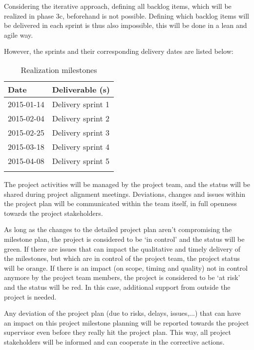 Considering the iterative approach, defining all backlog items, which will be realized in phase 3c, beforehand is not possible.
Defining which backlog items will be delivered in each sprint is thus also impossible, this will be done in a lean and agile way.

However, the sprints and their corresponding delivery dates  are listed below:
%
\begin{longtable}{|l|l|}\hline
    \textbf{Date} & \textbf{Deliverable (s)} \\\hline
	\endhead
    2015-01-14 & Delivery sprint 1\\\hline
    2015-02-04 & Delivery sprint 2\\\hline
    2015-02-25 & Delivery sprint 3\\\hline
    2015-03-18 & Delivery sprint 4\\\hline
    2015-04-08 & Delivery sprint 5\\\hline
  \caption{Realization milestones}
  \label{tab:realization-milestones}
\end{longtable}

\noindent
The project activities will be managed by the project team, and the status will be shared during project alignment meetings.
Deviations, changes and issues within the project plan will be communicated within the team itself, in full openness towards the project stakeholders.

As long as the changes to the detailed project plan aren't  compromising the milestone plan, the project is considered to be `in control' and the status will be green.
If there are issues that can impact the qualitative and timely delivery of the milestones, but which are in control of the project team, the project status will be orange.
If there is an impact (on scope, timing and quality) not in control anymore by the project team members, the project is considered to be `at risk' and the status will be red.
In this case, additional support from outside the project is needed.

Any deviation of the project plan (due to risks, delays, issues,...) that can have an impact on this project milestone planning will be reported towards the project supervisor even before they really hit the project plan.
This way, all project stakeholders will be informed and can cooperate in the corrective actions.
